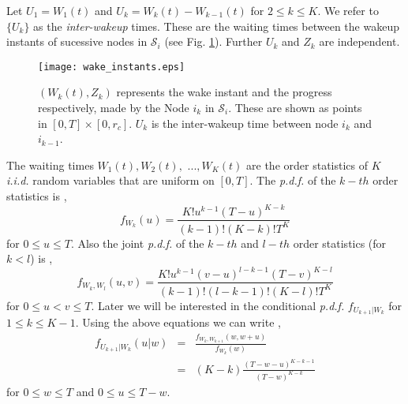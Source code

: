 \documentclass[onecolumn]{IEEEtran}
\begin{document}
Let $U_1=W_{1}(t)$ and $U_k=W_{{k}}(t)-W_{{k-1}}(t)$ for $2\le k\le
K$. We refer to $\{U_k\}$ as the \emph{inter-wakeup} times. These are
the waiting times between the wakeup instants of sucessive nodes in
$\mathcal{S}_i$ (see Fig. \ref{wakeinstants_figu}). Further $U_k$ and $Z_{k}$ are independent.
\begin{figure}[ht]
\centering
\texttt{[image: wake\_instants.eps]}
\caption{$(W_{k}(t),Z_{k})$ represents the wake instant and the
  progress respectively, made by the Node ${i_k}$ in $\mathcal{S}_i$.
  These are shown as points in $[0,T]\times[0,r_c]$. $U_k$ is the
  inter-wakeup time between node $i_k$ and
  $i_{k-1}$.\label{wakeinstants_figu}}
\end{figure}
 
The waiting times $W_{1}(t),W_{2}(t),$ $...,W_{{K}}(t)$ are the order
statistics of $K$ \emph{i.i.d.} random variables that are uniform on $[0,T]$.
The \emph{p.d.f.} of the $k-{th}$ order statistics is \cite[Chapter
2]{orderstatistics},
\begin{equation}
\label{orderstat_equn}
	f_{W_{k}}(u)=\frac{K! u^{k-1}(T-u)^{K-k}}{(k-1)!(K-k)!T^K}
\end{equation}
for $0\le u\le T$.  Also the joint \emph{p.d.f.} of the $k-{th}$ and $l-{th}$
order statistics (for $k<l$) is \cite[Chapter 2]{orderstatistics},
\begin{equation}
\label{jointorderstat_equn}
	f_{W_{k},W_{l}}(u,v)= \frac{K!u^{k-1}(v-u)^{l-k-1}(T-v)^{K-l}}{(k-1)!(l-k-1)!(K-l)!T^K}
\end{equation}
for $0\le u<v\le T$. Later we will be interested in  the  conditional \emph{p.d.f.}  $f_{U_{k+1}|W_{{k}}}$ for $1\le k\le K-1$. Using the above equations we can write ,
\begin{eqnarray}
	\label{condorderstat_equn}
	f_{U_{k+1}|W_{{k}}}(u|w)&=&\frac{f_{W_{{k}},W_{{k+1}}}(w,w+u)}{f_{W_{{k}}}(w)}\nonumber\\
	&=&(K-k)\frac{(T-w-u)^{K-k-1}}{(T-w)^{K-k}}
\end{eqnarray}
for $0\le w\le T$ and $0\le u\le T-w$.
\end{document}
